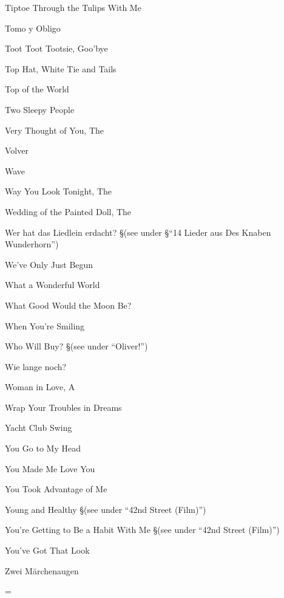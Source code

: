 \N Tiptoe Through the Tulips With Me

\N Tomo y Obligo

\N Toot Toot Tootsie, Goo'bye

\N Top Hat, White Tie and Tails

\N Top of the World

\N Two Sleepy People

\N Very Thought of You, The

\N Volver

\N Wave

\N Way You Look Tonight, The

\N Wedding of the Painted Doll, The

\N Wer hat das Liedlein erdacht?
\nobreak
\S (see under
\S ``14 Lieder aus Des Knaben Wunderhorn'')

\N We've Only Just Begun

\N What a Wonderful World

\N What Good Would the Moon Be?

\N When You're Smiling

\N Who Will Buy?
\nobreak
\S (see under ``Oliver!'')

\N Wie lange noch?

\N Woman in Love, A

\N Wrap Your Troubles in Dreams

\N Yacht Club Swing

\N You Go to My Head

\N You Made Me Love You

\N You Took Advantage of Me

\N Young and Healthy
\nobreak
\S (see under ``42nd Street (Film)'')

\N You're Getting to Be a Habit With Me
\nobreak
\S (see under ``42nd Street (Film)'')

\N You've Got That Look

\N Zwei M{\"a}rchenaugen

\singlecolumn
\vfil\eject
\ifseparate
\else
\pagecnt=\pageno
\fi
\endinput

